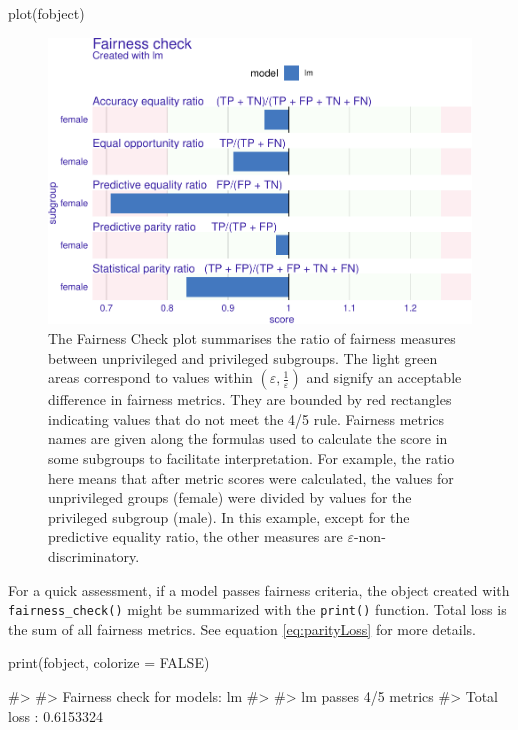 \begin{Schunk}
\begin{Sinput}
plot(fobject)
\end{Sinput}
\begin{figure}

{\centering \includegraphics[width=0.75\linewidth]{Wisniewski-Biecek_files/figure-latex/fairness-plot-1-1} 

}

\caption[The Fairness Check plot summarises the ratio of fairness measures between unprivileged and privileged subgroups]{The Fairness Check plot summarises the ratio of fairness measures between unprivileged and privileged subgroups. The light green areas correspond to values within $(\varepsilon, \frac{1}{\varepsilon})$ and signify an acceptable difference in fairness metrics. They are bounded by red rectangles indicating values that do not meet the 4/5 rule. Fairness metrics names are given along the formulas used to calculate the score in some subgroups to facilitate interpretation. For example, the ratio here means that after metric scores were calculated, the values for unprivileged groups (female) were divided by values for the privileged subgroup (male). In this example, except for the predictive equality ratio, the other measures are $\varepsilon$-non-discriminatory. }\label{fig:fairness-plot-1}
\end{figure}
\end{Schunk}

For a quick assessment, if a model passes fairness criteria, the object
created with \texttt{fairness\_check()} might be summarized with the
\texttt{print()} function. Total loss is the sum of all fairness
metrics. See equation \eqref{eq:parityLoss} for more details.

\begin{Schunk}
\begin{Sinput}
print(fobject, colorize = FALSE)
\end{Sinput}
\begin{Soutput}
#> 
#> Fairness check for models: lm 
#> 
#> lm passes 4/5 metrics
#> Total loss :  0.6153324
\end{Soutput}
\end{Schunk}

